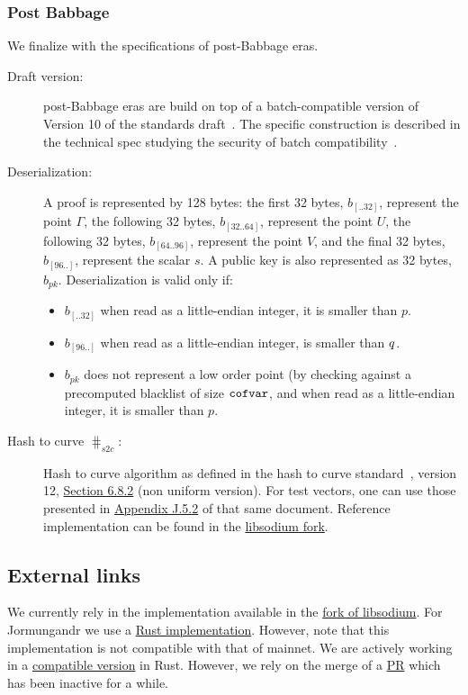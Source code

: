 \subsubsection{Post Babbage}
We finalize with the specifications of post-Babbage eras.
\begin{description}
    \item[Draft version:] post-Babbage eras are build on top of a batch-compatible version of Version 10 of the
    standards draft~\cite{vrfdraft10}. The specific construction is described in
    the technical spec studying the security of batch compatibility~\cite{batchspec}.
    \item[Deserialization:] A \vrf proof is represented by 128 bytes: the first 32 bytes, $b_{[..32]}$, represent the
    point $\Gamma$, the following 32 bytes, $b_{[32..64]}$, represent the point $U$, the following 32 bytes,
    $b_{[64..96]}$, represent the point $V$, and the final 32 bytes, $b_{[96..]}$, represent the scalar $s$. A
    public key is also represented as 32 bytes, $b_{pk}$. Deserialization is valid only if:
    \begin{itemize}
        \item $b_{[..32]}$ when read as a little-endian integer, it is smaller than $p$.
        \item $b_{[96..]}$ when read as a little-endian integer, is smaller than $q$.
        \item $b_{pk}$ does not represent a low order point (by checking against a precomputed blacklist of size
        $\texttt{cofvar}$, and when read as a little-endian integer, it is smaller than $p$.
    \end{itemize}
    \item[Hash to curve $\hash_{s2c}$:] Hash to curve algorithm
    as defined in the hash to curve standard~\cite{h2cdraft13}, version 12, \href{https://datatracker.ietf
.org/doc/html/draft-irtf-cfrg-hash-to-curve-12#section-6.8.2}{Section 6.8.2} (non uniform version). For test
    vectors, one can use those presented in \href{https://datatracker.ietf
.org/doc/html/draft-irtf-cfrg-hash-to-curve-13#appendix-J.5.2}{Appendix J.5.2} of that same document. Reference
    implementation can be found in the \href{https://github
.com/input-output-hk/libsodium/blob/iquerejeta/ECVRF-EDWARDS25519-SHA512-TAI/src/libsodium/crypto_vrf
/ietfdraft10/convert.c#L88}{libsodium fork}.
\end{description}

\subsection{External links}
We currently rely in the implementation available in the \href{https://github
.com/input-output-hk/libsodium/tree/iquerejeta/ECVRF-EDWARDS25519-SHA512-TAI/src/libsodium/crypto_vrf}{fork of
libsodium}. For Jormungandr we use a \href{https://github
.com/input-output-hk/chain-libs/tree/master/chain-crypto/src/algorithms/vrf}{Rust implementation}. However, note that
this implementation is not compatible with that of mainnet. We are actively working in a \href{https://github
.com/input-output-hk/vrf}{compatible version} in Rust. However, we rely on the merge of a \href{https://github.com/dalek-cryptography/curve25519-dalek/pull/377}{PR} which has been inactive for a while.
